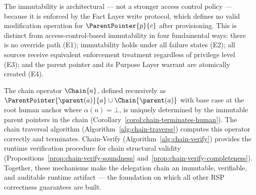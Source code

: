The immutability is architectural --- not a stronger access control policy --- because it is enforced by the Fact Layer write protocol, which defines no valid modification operation for $\ParentPointer{p}{c}$ after provisioning. This is distinct from access-control-based immutability in four fundamental ways: there is no override path (E1); immutability holds under all failure states (E2); all sources receive equivalent enforcement treatment regardless of privilege level (E3); and the parent pointer and its Purpose Layer warrant are atomically created (E4).

The chain operator $\Chain{a}$, defined recursively as $\ParentPointer{\parent(a)}{a} \cup \Chain{\parent(a)}$ with base case at the root human anchor where $\alpha(n) = \bot$, is uniquely determined by the immutable parent pointers in the chain (Corollary~\ref{corol:chain-terminates-human}). The chain traversal algorithm (Algorithm~\ref{alg:chain-traverse}) computes this operator correctly and terminates. Chain-Verify (Algorithm~\ref{alg:chain-verify}) provides the runtime verification procedure for chain structural validity (Propositions~\ref{prop:chain-verify-soundness} and~\ref{prop:chain-verify-completeness}). Together, these mechanisms make the delegation chain an immutable, verifiable, and auditable runtime artifact --- the foundation on which all other RSP correctness guarantees are built.
